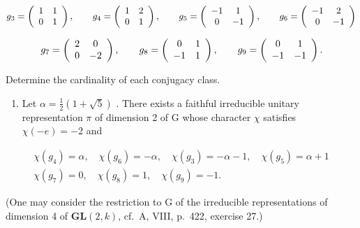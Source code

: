 \[
g _ {3} = \left( \begin{array}{c c} 1 & 1 \\ 0 & 1 \end{array} \right), \qquad g _ {4} = \left( \begin{array}{c c} 1 & 2 \\ 0 & 1 \end{array} \right), \qquad g _ {5} = \left( \begin{array}{c c} - 1 & 1 \\ 0 & - 1 \end{array} \right), \qquad g _ {6} = \left( \begin{array}{c c} - 1 & 2 \\ 0 & - 1 \end{array} \right)
\]

\[
g _ {7} = \left( \begin{array}{c c} 2 & 0 \\ 0 & - 2 \end{array} \right), \qquad g _ {8} = \left( \begin{array}{c c} 0 & 1 \\ - 1 & 1 \end{array} \right), \qquad g _ {9} = \left( \begin{array}{c c} 0 & 1 \\ - 1 & - 1 \end{array} \right).
\]

Determine the cardinality of each conjugacy class.

\begin{enumerate}
\def\labelenumi{\alph{enumi})}
\setcounter{enumi}{1}
\tightlist
\item
  Let \(\alpha = \frac{1}{2}(1 + \sqrt{5})\) . There exists a faithful irreducible unitary representation \(\pi\) of dimension 2 of G whose character \(\chi\) satisfies \(\chi(-e) = -2\) and
\end{enumerate}

\[
\begin{array}{c} \chi (g _ {4}) = \alpha , \quad \chi (g _ {6}) = - \alpha , \quad \chi (g _ {3}) = - \alpha - 1, \quad \chi (g _ {5}) = \alpha + 1 \\ \chi (g _ {7}) = 0, \quad \chi (g _ {8}) = 1, \quad \chi (g _ {9}) = - 1. \end{array}
\]

(One may consider the restriction to G of the irreducible representations of dimension 4 of \(\mathbf{GL}(2,k)\), cf.~A, VIII, p.~422, exercise 27.)

